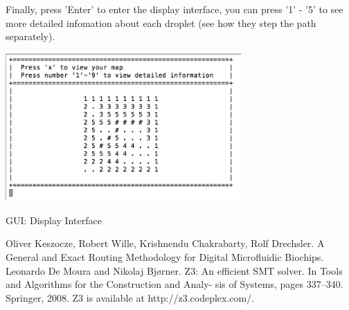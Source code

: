 \documentclass[twocolumn]{article}
\begin{document}
Finally, press 'Enter' to enter the display interface, you can press '1' - '5' to see more detailed infomation about each droplet (see how they step the path separately).

\begin{center}
\makeatletter
\def\@captype{figure}
\makeatother
\includegraphics [width = 9cm]{GUI-display}
\caption{GUI: Display Interface}
\label{gd}
\end{center}


\begin{thebibliography}{1}
Oliver Keszocze, Robert Wille, Krishnendu Chakrabarty, Rolf Drechsler. A General and Exact Routing Methodology for Digital Microfluidic Biochips.
Leonardo De Moura and Nikolaj Bjørner. Z3: An efficient SMT solver. In Tools and Algorithms for the Construction and Analy- sis of Systems, pages 337–340. Springer, 2008. Z3 is available at http://z3.codeplex.com/.
\end{thebibliography}
\end{document}
